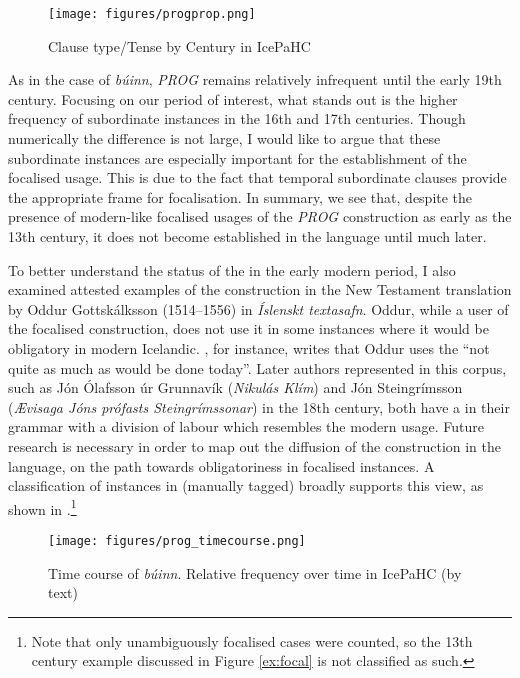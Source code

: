 \documentclass[output=paper,colorlinks,citecolor=brown]{langscibook}
\begin{document}
\begin{figure}
        \texttt{[image: figures/progprop.png]}
        \caption{Clause type/Tense by Century in IcePaHC}
        \label{fig:image3}
\end{figure}

\largerpage
As in the case of \textit{búinn}, \textit{PROG} remains relatively infrequent until the early 19th century. Focusing on our period of interest, what stands out is the higher frequency of subordinate instances in the 16th and 17th centuries. Though numerically the difference is not large, I would like to argue that these subordinate instances are especially important for the establishment of the focalised usage. This is due to the fact that temporal subordinate clauses provide the appropriate frame for focalisation. In summary, we see that, despite the presence of modern-like focalised usages of the \textit{PROG} construction as early as the 13th century, it does not become established in the language until much later. 

\newpage
\largerpage
To better understand the status of the   in the early modern period, I also examined attested examples of the construction in the New Testament translation by Oddur Gottskálksson (1514--1556) in \textit{Íslenskt textasafn}. Oddur, while a user of the focalised construction, does not use it in some instances where it would be obligatory in modern Icelandic. \citet[135--136]{helgason1929malid}, for instance, writes that Oddur uses the   ``not quite as much as would be done today''. Later authors represented in this corpus, such as Jón Ólafsson úr Grunnavík (\textit{Nikulás Klím}) and Jón Steingrímsson (\textit{Ævisaga Jóns prófasts Steingrímssonar}) in the 18th century, both have a   in their grammar with a division of labour which resembles the modern usage. Future research is necessary in order to map out the diffusion of the   construction in the language, on the path towards obligatoriness in focalised instances. A classification of   instances in  (manually tagged) broadly supports this view, as shown in .\footnote{Note that only unambiguously focalised cases were counted, so the 13th century example discussed in Figure \ref{ex:focal} is not classified as such.}
\clearpage


\begin{figure}[t]
        \texttt{[image: figures/prog\_timecourse.png]}
        \caption{Time course of \textit{búinn}. Relative frequency over time in IcePaHC (by text)}
        \label{fig:image4}
\end{figure}
\end{document}
